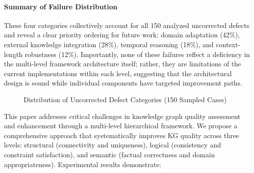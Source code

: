 \documentclass[runningheads]{llncs}
\begin{document}
\paragraph{Summary of Failure Distribution}
These four categories collectively account for all 150 analyzed uncorrected defects and reveal a clear priority ordering for future work: domain adaptation (42\%), external knowledge integration (28\%), temporal reasoning (18\%), and context-length robustness (12\%). Importantly, none of these failures reflect a deficiency in the multi-level framework architecture itself; rather, they are limitations of the current implementations within each level, suggesting that the architectural design is sound while individual components have targeted improvement paths.

\begin{figure}[H]
    \centering
    \caption{Distribution of Uncorrected Defect Categories (150 Sampled Cases)}
    \label{fig:failure_dist}
\end{figure}

This paper addresses critical challenges in knowledge graph quality assessment and enhancement through a multi-level hierarchical framework. We propose a comprehensive approach that systematically improves KG quality across three levels: structural (connectivity and uniqueness), logical (consistency and constraint satisfaction), and semantic (factual correctness and domain appropriateness). Experimental results demonstrate:
\end{document}
